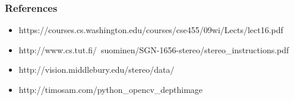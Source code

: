 \documentclass{beamer}
\begin{document}

\begin{frame}[shrink=5]
\frametitle{References}
\begin{itemize}
\item https://courses.cs.washington.edu/courses/cse455/09wi/Lects/lect16.pdf
\item http://www.cs.tut.fi/~suominen/SGN-1656-stereo/stereo\_instructions.pdf
\item http://vision.middlebury.edu/stereo/data/
\item http://timosam.com/python\_opencv\_depthimage
\end{itemize}
\end{frame}

\end{document}
